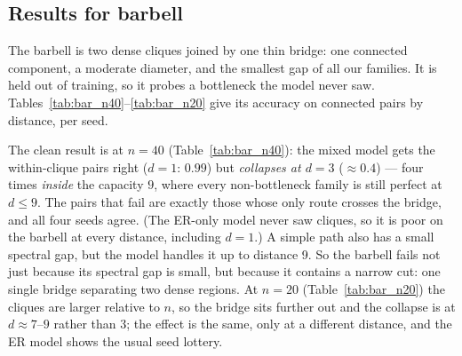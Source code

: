 \documentclass[11pt,a4paper]{article}
\begin{document}
\subsection{Results for barbell}

The barbell is two dense cliques joined by one thin bridge: one connected component, a moderate
diameter, and the smallest gap of all our families. It is held out of training, so it probes a
bottleneck the model never saw. Tables~\ref{tab:bar_n40}--\ref{tab:bar_n20} give its accuracy on
connected pairs by distance, per seed.

The clean result is at $n=40$ (Table~\ref{tab:bar_n40}): the mixed model gets the within-clique
pairs right ($d=1$: $0.99$) but \emph{collapses at $d=3$} ($\approx0.4$) --- four times
\emph{inside} the capacity $9$, where every non-bottleneck family is still perfect at $d\le9$.
The pairs that fail are exactly those whose only route crosses the bridge, and all four seeds
agree. (The ER-only model never saw cliques, so it is poor on the barbell at every distance,
including $d=1$.) A simple path also has a small spectral gap, but the model handles it up to distance 9. So the barbell fails not just because its spectral gap is small, but because it contains a narrow cut: one single bridge separating two dense regions. At $n=20$ (Table~\ref{tab:bar_n20}) the cliques are larger relative to $n$, so
the bridge sits further out and the collapse is at $d\approx7$--$9$ rather than $3$; the effect
is the same, only at a different distance, and the ER model shows the usual seed lottery.
\end{document}
